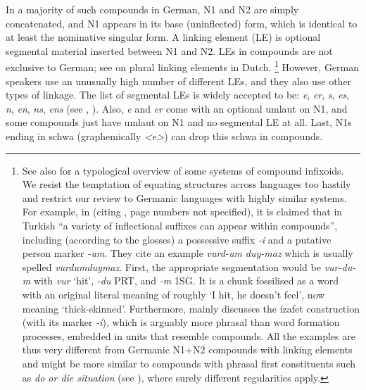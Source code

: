 In a majority of such compounds in German, N1 and N2 are simply concatenated, and N1 appears in its base (uninflected) form, which is identical to at least the nominative singular form.
A linking element (LE) is optional segmental material inserted between N1 and N2.
LEs in compounds are not exclusive to German; see \textcite{SchreuderEa1998,BangaEa2013a,BangaEa2013b} on plural linking elements in Dutch.%
\footnote{See also \textcite[27]{KrottEa2007} for a typological overview of some systems of compound infixoids.
We resist the temptation of equating structures across languages too hastily and restrict our review to Germanic languages with highly similar systems.
For example, in \textcite[4]{KirchnerNicoladis2009} (citing \citealt{Spencer1991}, page numbers not specified), it is claimed that in Turkish ``a variety of inflectional suffixes can appear within compounds'', including (according to the glosses) a possessive suffix \textit{-i} and a putative person marker \mbox{\textit{-um}}.
They cite an example \textit{vurd-um duy-maz} which is usually spelled \textit{vurdumduymaz}.
First, the appropriate segmentation would be \textit{vur-du-m} with \textit{vur} `hit', \textit{-du} PRT, and \textit{-m} \textsc{1SG}.
It is a chunk fossilised as a word with an original literal meaning of roughly `I hit, he doesn't feel', now meaning `thick-skinned'.
Furthermore, \textcite[313--319]{Spencer1991} mainly discusses the izafet construction (with its marker \textit{-i}), which is arguably more phrasal than word formation processes, embedded in units that resemble compounds.
All the examples are thus very different from Germanic N1+N2 compounds with linking elements and might be more similar to compounds with phrasal first constituents such as \textit{do or die situation} (see \citealt[366]{Olsen2015}), where surely different regularities apply.
}
However, German speakers use an unusually high number of different LEs, and they also use other types of linkage.
The list of segmental LEs is widely accepted to be: \textit{e}, \textit{er}, \textit{s}, \textit{es}, \textit{n}, \textit{en}, \textit{ns}, \textit{ens} (see \citealt[31]{Neef2015}, \citealt{KrottEa2007}).
Also, \textit{e} and \textit{er} come with an optional umlaut on N1, and some compounds just have umlaut on N1 and no segmental LE at all.
Last, N1s ending in schwa (graphemically \textit{<e>}) can drop this schwa in compounds.

